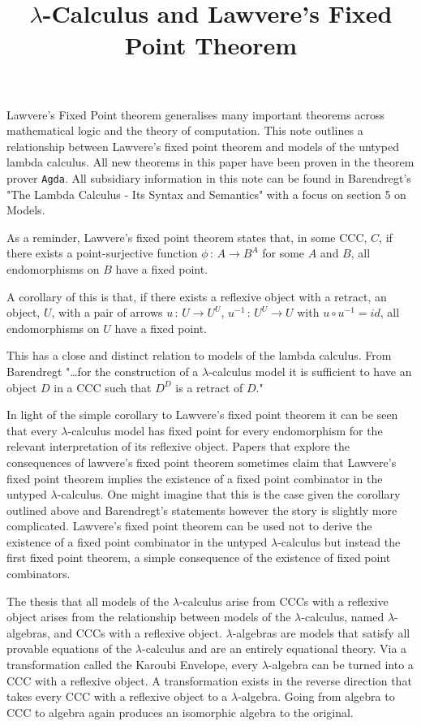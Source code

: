 \documentclass[a4paper,10pt]{article}
\title{$\lambda$-Calculus and Lawvere's Fixed Point Theorem}
\date{}
\begin{document}
\maketitle
\vspace{-20mm}
Lawvere's Fixed Point theorem generalises many important theorems across
mathematical logic and the theory of computation. This note outlines a
relationship between Lawvere's fixed point theorem and models of the untyped
lambda calculus. All new theorems in this paper have been proven in the theorem
prover \verb|Agda|. All subsidiary information in this note can be found in
Barendregt's  "The Lambda Calculus - Its Syntax and Semantics" with a focus on
section 5 on Models.

As a reminder, Lawvere's fixed point theorem states that, in some CCC, $C$, if
there exists a point-surjective function $\phi \, : \, A \rightarrow B^A$ for
some $A$ and $B$, all endomorphisms on $B$ have a fixed point.

A corollary of this is that, if there exists a reflexive object with a retract,
an object, $U$,  with a pair of arrows $u \, : \, U \rightarrow U^U$, $u^{-1} \,
: \, U^U \rightarrow U$ with $u \circ u^{-1} = id$, all endomorphisms on $U$
have a fixed point.

This has a close and distinct relation to models of the lambda calculus. From
Barendregt "\ldots for the construction of a $\lambda$-calculus model it
is sufficient to have an object $D$ in a CCC such that $D^D$ is a retract of
$D$."

In light of the simple corollary to Lawvere's fixed point theorem it can be seen
that every $\lambda$-calculus model has fixed point for every endomorphism for
the relevant interpretation of its reflexive object. Papers that explore the
consequences of lawvere's fixed point theorem sometimes claim that Lawvere's
fixed point theorem implies the existence of a fixed point combinator in the
untyped $\lambda$-calculus. One might imagine that this is the case given the
corollary outlined above and Barendregt's statements however the story is
slightly more complicated. Lawvere's fixed point theorem can be used not to
derive the existence of a fixed point combinator in the untyped
$\lambda$-calculus but instead the first fixed point theorem, a simple
consequence of the existence of fixed point combinators.

The thesis that all models of the $\lambda$-calculus arise from CCCs with a
reflexive object arises from the relationship between models of the
$\lambda$-calculus, named $\lambda$-algebras, and CCCs with a reflexive object.
$\lambda$-algebras are models that satisfy  all provable equations of the
$\lambda$-calculus and are an entirely equational theory. Via a transformation
called the Karoubi Envelope, every $\lambda$-algebra can be turned into a CCC
with a reflexive object. A transformation exists in the reverse direction that
takes every CCC with a reflexive object to a $\lambda$-algebra. Going from
algebra to CCC to algebra again produces an isomorphic algebra to the original.
\end{document}
